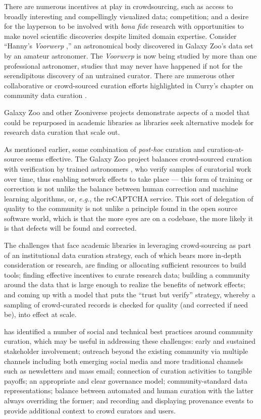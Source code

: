 \documentclass[man,12pt,biblatex]{apa6}
\let\footnote=\endnote
\begin{document}
There are numerous incentives at play in crowdsourcing, such as access
to broadly interesting and compellingly visualized data; competition;
and a desire for the layperson to be involved with \textit{bona fide}
research with opportunities to make novel scientific discoveries
despite limited domain expertise. Consider ``Hanny's
\textit{Voorwerp} \parencite{wiki:voorwerp},'' an astronomical body
discovered in Galaxy Zoo's data set by an amateur astronomer. The
\textit{Voorwerp} is now being studied by more than one professional
astronomer, studies that may never have happened if not for the
serendipitous discovery of an untrained curator.  There are numerous
other collaborative or crowd-sourced curation efforts highlighted in
Curry's chapter on community data curation \parencite{curry:community}.

Galaxy Zoo and other Zooniverse projects demonstrate aspects of a
model that could be repurposed in academic libraries as libraries seek
alternative models for research data curation that scale out.

As mentioned earlier, some combination of \textit{post-hoc} curation
and curation-at-source seems effective. The Galaxy Zoo project
balances crowd-sourced curation with verification by trained
astronomers \parencite{adams:galaxyzoo}, who verify samples of curatorial
work over time, thus enabling network effects to take place --- this
form of training or correction is not unlike the balance between human
correction and machine learning algorithms, or, \textit{e.g.}, the
reCAPTCHA \footnote{\url{http://www.google.com/recaptcha}}
service. This sort of delegation of quality to the community is not
unlike a principle found in the open source software world, which is
that the more eyes are on a codebase, the more likely it is that
defects will be found and corrected.

The challenges that face academic libraries in leveraging
crowd-sourcing as part of an institutional data curation strategy,
each of which bears more in-depth consideration or research, are
finding or allocating sufficient resources to build tools; finding
effective incentives to curate research data; building a community
around the data that is large enough to realize the benefits of
network effects; and coming up with a model that puts the ``trust but
verify'' strategy, whereby a sampling of crowd-curated records is
checked for quality (and corrected if need be), into effect at scale.

\textcite{curry:community} has identified a number of social and
technical best practices around community curation, which may be
useful in addressing these challenges: early and sustained stakeholder
involvement; outreach beyond the existing community via multiple
channels including both emerging social media and more traditional
channels such as newsletters and mass email; connection of curation
activities to tangible payoffs; an appropriate and clear governance
model; community-standard data representations; balance between
automated and human curation with the latter always overriding the
former; and recording and displaying provenance events to provide
additional context to crowd curators and users.
\end{document}
